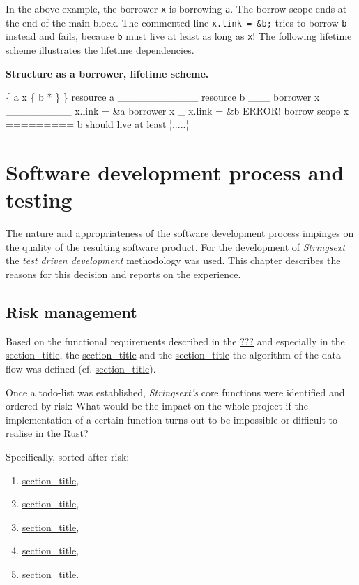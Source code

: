 In the above example, the borrower \texttt{x} is borrowing \texttt{a}.
The borrow scope ends at the end of the main block. The commented line
\texttt{x.link\ =\ \&b;} tries to borrow \texttt{b} instead and fails,
because \texttt{b} must live at least as long as \texttt{x}! The
following lifetime scheme illustrates the lifetime dependencies.

\textbf{Structure as a borrower, lifetime scheme.}

\{ a x \{ b * \} \} resource a
\textbar{}\_\_\_\_\_\_\_\_\_\_\_\textbar{} resource b
\textbar{}\_\_\_\textbar{} borrower x
\textbar{}\_\_\_\_\_\_\_\_\_\textbar{} x.link = \&a borrower x
\textbar{}\_\textbar{} x.link = \&b ERROR! borrow scope x
\textbar{}=========\textbar{} b should live at least ¦.....¦

\hypertarget{dev-process}{\section{Software development process and
testing}\label{dev-process}}

The nature and appropriateness of the software development process
impinges on the quality of the resulting software product. For the
development of \emph{Strings­ext} the \emph{test driven development}
methodology was used. This chapter describes the reasons for this
decision and reports on the experience.

\subsection{Risk management}\label{_risk_management}

Based on the functional requirements described in the
\protect\hyperlink{_specifications}{???} and especially in the
\protect\hyperlink{req-concurrent}{section\_title}, the
\protect\hyperlink{req-batch-processing}{section\_title} and the
\protect\hyperlink{req-merge-findings}{section\_title} the algorithm of
the data-flow was defined (cf.
\protect\hyperlink{_scanner_algorithm}{section\_title}).

Once a todo-list was established, \emph{Strings­ext's} core functions
were identified and ordered by risk: What would be the impact on the
whole project if the implementation of a certain function turns out to
be impossible or difficult to realise in the Rust?

Specifically, sorted after risk:

\begin{enumerate}
\def\labelenumi{\arabic{enumi}.}
\item
  \protect\hyperlink{decoder}{section\_title},
\item
  \protect\hyperlink{_concurrency}{section\_title},
\item
  \protect\hyperlink{_polymorphic_io}{section\_title},
\item
  \protect\hyperlink{_merging_vectors}{section\_title},
\item
  \protect\hyperlink{filter}{section\_title}.
\end{enumerate}

